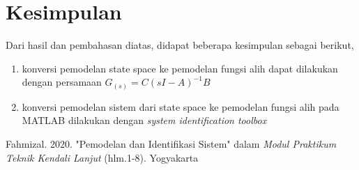 \documentclass[../main.tex]{subfiles}
\begin{document}
    \section{Kesimpulan}
        Dari hasil dan pembahasan diatas, didapat beberapa kesimpulan sebagai berikut,
        \begin{enumerate}
            \item konversi pemodelan state space ke pemodelan fungsi alih dapat dilakukan dengan persamaan $G_{(s)} = C(sI - A)^{-1} B$
            \item konversi pemodelan sistem dari state space ke pemodelan fungsi alih pada MATLAB dilakukan dengan \textit{system identification toolbox}
        \end{enumerate}
    \begin{thebibliography}{2}
         Fahmizal. 2020. "Pemodelan dan Identifikasi Sistem" dalam \textit{Modul Praktikum Teknik Kendali Lanjut} (hlm.1-8). Yogyakarta
    \end{thebibliography}
\end{document}
